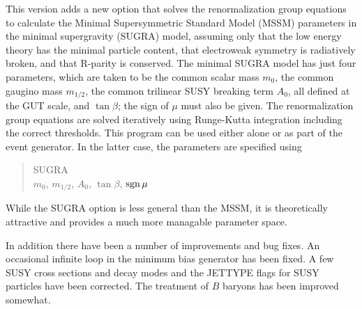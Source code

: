        This version adds a new option that solves the renormalization group
equations to calculate the Minimal Supersymmetric Standard Model (MSSM)
parameters in the minimal supergravity (SUGRA) model, assuming only that the
low energy theory has the minimal particle content, that electroweak
symmetry is radiatively broken, and that R-parity is conserved.  The minimal
SUGRA model has just four parameters, which are taken to be the common
scalar mass $m_0$, the common gaugino mass $m_{1/2}$, the common trilinear
SUSY breaking term $A_0$, all defined at the GUT scale, and $\tan\beta$; the
sign of $\mu$ must also be given.  The renormalization group equations are
solved iteratively using Runge-Kutta integration including the correct
thresholds.  This program can be used either alone or as part of the event
generator.  In the latter case, the parameters are specified using
\begin{verse}
SUGRA\\
$m_0$, $m_{1/2}$, $A_0$, $\tan\beta$, $\mathop{\rm sgn}\mu$
\end{verse}
While the SUGRA option is less general than the MSSM, it is theoretically
attractive and provides a much more managable parameter space.

      In addition there have been a number of improvements and bug fixes.  An
occasional infinite loop in the minimum bias generator has been fixed.  A few
SUSY cross sections and decay modes and the JETTYPE flags for SUSY
particles have been corrected.  The treatment of $B$ baryons has been
improved somewhat.



